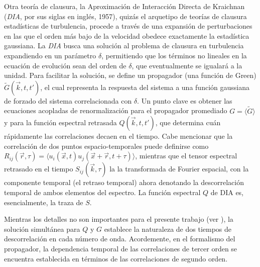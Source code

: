 Otra teoría de clausura, la Aproximación de Interacción Directa de
Kraichnan (\textit{DIA}, por sus siglas en inglés, 1957), quizás el
arquetipo de teorías de clausura estadísticas de turbulencia, procede
a través de una expansión de perturbaciones en las que el orden más
bajo de la velocidad obedece exactamente la estadística gaussiana. La
\textit{DIA} busca una solución al problema de clausura en turbulencia
expandiendo en un parámetro $\delta$, permitiendo que los términos no
lineales en la ecuación de evolución sean del orden de $\delta$, que
eventualmente se igualará a la unidad. Para facilitar la solución, se
define un propagador (una función de Green) $\tilde{G}(\vec{k}, t,
t')$, el cual representa la respuesta del sistema a una función
gaussiana de forzado del sistema correlacionada con $\delta$. Un punto
clave es obtener las ecuaciones acopladas de renormalización para el
propagador promediado $G = \langle\tilde{G}\rangle$ y para la función
espectral retrasada $Q(\vec{k}, t, t')$, que determina cuán
rápidamente las correlaciones decaen en el tiempo. Cabe mencionar que
la correlación de dos puntos espacio-temporales puede definirse como
$R_{ij}(\vec{r}, \tau) = \langle u_i(\vec{x}, t) u_j(\vec{x}+\vec{r},
t+\tau)\rangle$, mientras que el tensor espectral retrasado en el
tiempo $S_{ij}(\vec{k},\tau)$ la la transformada de Fourier espacial,
con la componente temporal (el retraso temporal) ahora denotando la
descorrelación temporal de ambos elementos del espectro. La función
espectral $Q$ de DIA es, esencialmente, la traza de $S$.

Mientras los detalles no son importantes para el presente trabajo (ver
\cite{leslie_developments_1973, mccomb_physics_1990}), la solución
simultánea para $Q$ y $G$ establece la naturaleza de dos tiempos de
descorrelación en cada número de onda. Acordemente, en el formalismo
del propagador, la dependencia temporal de las correlaciones de tercer
orden se encuentra establecida en términos de las correlaciones de
segundo orden.

